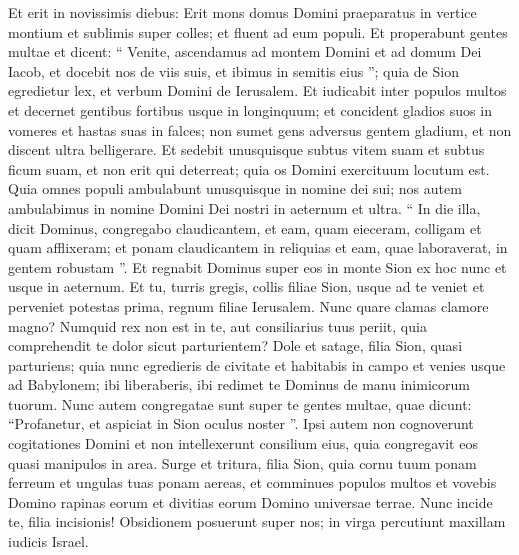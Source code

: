 \begin{biblechapter}
\begin{biblechapter}
\begin{biblechapter}
\begin{biblechapter}
 \verse Et erit in novissimis diebus:
 Erit mons domus Domini
 praeparatus in vertice montium
 et sublimis super colles;
 et fluent ad eum populi.
 \verse Et properabunt gentes multae et dicent:
 “ Venite, ascendamus ad montem Domini
 et ad domum Dei Iacob,
 et docebit nos de viis suis,
 et ibimus in semitis eius ”;
 quia de Sion egredietur lex,
 et verbum Domini de Ierusalem.
 \verse Et iudicabit inter populos multos
 et decernet gentibus fortibus usque in longinquum;
 et concident gladios suos in vomeres
 et hastas suas in falces;
 non sumet gens adversus gentem gladium,
 et non discent ultra belligerare.
 \verse Et sedebit unusquisque subtus vitem suam
 et subtus ficum suam,
 et non erit qui deterreat;
 quia os Domini exercituum locutum est.
 \verse Quia omnes populi ambulabunt
 unusquisque in nomine dei sui;
 nos autem ambulabimus in nomine Domini
 Dei nostri in aeternum et ultra.
 \verse “ In die illa, dicit Dominus,
 congregabo claudicantem,
 et eam, quam eieceram, colligam
 et quam afflixeram;
 \verse et ponam claudicantem in reliquias
 et eam, quae laboraverat, in gentem robustam ”.
 Et regnabit Dominus super eos in monte Sion
 ex hoc nunc et usque in aeternum.
 \verse Et tu, turris gregis,
 collis filiae Sion,
 usque ad te veniet et perveniet
 potestas prima,
 regnum filiae Ierusalem.
 \verse Nunc quare clamas clamore magno?
 Numquid rex non est in te,
 aut consiliarius tuus periit,
 quia comprehendit te dolor sicut parturientem?
 \verse Dole et satage,
 filia Sion, quasi parturiens;
 quia nunc egredieris de civitate
 et habitabis in campo
 et venies usque ad Babylonem;
 ibi liberaberis,
 ibi redimet te Dominus
 de manu inimicorum tuorum.
 \verse Nunc autem congregatae sunt super te
 gentes multae,
 quae dicunt: “Profanetur,
 et aspiciat in Sion oculus noster ”.
 \verse Ipsi autem non cognoverunt
 cogitationes Domini
 et non intellexerunt consilium eius,
 quia congregavit eos quasi manipulos in area.
 \verse Surge et tritura, filia Sion,
 quia cornu tuum ponam ferreum
 et ungulas tuas ponam aereas,
 et comminues populos multos
 et vovebis Domino rapinas eorum
 et divitias eorum Domino universae terrae.
 \verse Nunc incide te, filia incisionis!
 Obsidionem posuerunt super nos;
 in virga percutiunt
 maxillam iudicis Israel.
 

\end{biblechapter}
\end{biblechapter}
\end{biblechapter}
\end{biblechapter}
